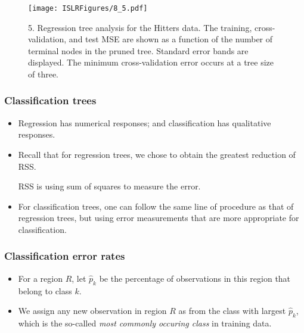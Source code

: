 \documentclass{beamer}
\begin{document}
              
              \begin{frame}
              	\frametitle{ }
              	\begin{figure}
              		\centering
              		
              		\centering
              		\texttt{[image: ISLRFigures/8\_5.pdf]}
              		\caption{5. Regression tree analysis for the Hitters data. The training,
              			cross-validation, and test MSE are shown as a function of the number of terminal
              			nodes in the pruned tree. Standard error bands are displayed. The minimum
              			cross-validation error occurs at a tree size of three.
              		}
              	\end{figure}
              \end{frame}
              
         
              \begin{frame}
              	\frametitle{Classification trees}
              	\begin{itemize}
              		\item Regression has numerical responses; and classification has
              		qualitative responses. 
              		\item  Recall that for regression trees, we chose to 
              		obtain the greatest reduction of RSS.
              		
              		 RSS is using sum of squares to measure
              		the error.  
              		\item  For classification trees, one can follow the same line of 
                       procedure as that of regression trees, but using error measurements that are
                       more appropriate for classification.
              
              	\end{itemize}
              \end{frame} 
              
                \begin{frame}
                	\frametitle{Classification error rates}
                	\begin{itemize}
                		\item  For a region $R$, let $\hat p_k$ be the percentage of observations
                		in this region that belong to class $k$. 
                		\item  We assign any new observation in region $R$ as from 
                		the class with largest $\hat p_k$, which is the so-called {\it  most commonly occuring class } in training data. 
                		 
                		\end{itemize}
                	\end{frame} 
                	
\end{document}
